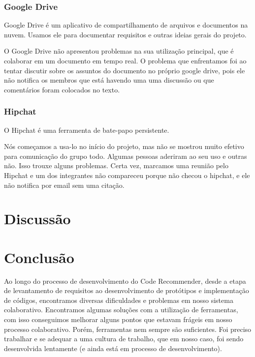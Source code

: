 \documentclass{acm_proc_article-sp}
\begin{document}
\subsubsection{Google Drive}
Google Drive é um aplicativo de compartilhamento de arquivos e documentos na nuvem. Usamos ele para documentar requisitos e outras ideias gerais do projeto.

O Google Drive não apresentou problemas na sua utilização principal, que é colaborar em um documento em tempo real.
O problema que enfrentamos foi ao tentar discutir sobre os assuntos do documento no próprio google drive, pois ele não
notifica os membros que está havendo uma uma discussão ou que comentários foram colocados no texto.

\subsubsection{Hipchat}
O Hipchat é uma ferramenta de bate-papo persistente.

Nós começamos a usa-lo no início do projeto, mas não se mostrou muito efetivo
para comunicação do grupo todo. Algumas pessoas aderiram ao seu uso e outras não. Isso trouxe alguns problemas.
Certa vez, marcamos uma reunião pelo Hipchat e um dos integrantes não compareceu porque não checou o hipchat, e ele não notifica por email
sem uma citação.

\section{Discussão}
%

\section{Conclusão}
Ao longo do processo de desenvolvimento do Code Recommender, desde a etapa de levantamento de 
requisitos ao desenvolvimento de protótipos e implementação de códigos, encontramos diversas 
dificuldades e problemas em nosso sistema colaborativo. Encontramos algumas soluções 
com a utilização de ferramentas, com isso conseguimos melhorar alguns pontos que estavam frágeis
em nosso processo colaborativo. Porém, ferramentas nem sempre são suficientes. Foi preciso trabalhar
e se adequar a uma cultura de trabalho, que em nosso caso, foi sendo desenvolvida lentamente (e ainda está
em processo de desenvolvimento). 
\end{document}
